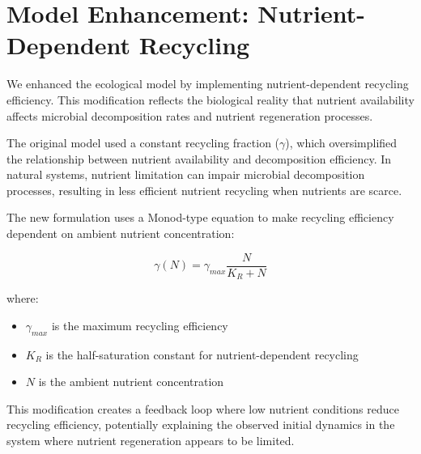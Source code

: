 \section{Model Enhancement: Nutrient-Dependent Recycling}

We enhanced the ecological model by implementing nutrient-dependent recycling efficiency. This modification reflects the biological reality that nutrient availability affects microbial decomposition rates and nutrient regeneration processes.

The original model used a constant recycling fraction ($\gamma$), which oversimplified the relationship between nutrient availability and decomposition efficiency. In natural systems, nutrient limitation can impair microbial decomposition processes, resulting in less efficient nutrient recycling when nutrients are scarce.

The new formulation uses a Monod-type equation to make recycling efficiency dependent on ambient nutrient concentration:

\[ \gamma(N) = \gamma_{max} \frac{N}{K_R + N} \]

where:
\begin{itemize}
    \item $\gamma_{max}$ is the maximum recycling efficiency
    \item $K_R$ is the half-saturation constant for nutrient-dependent recycling
    \item $N$ is the ambient nutrient concentration
\end{itemize}

This modification creates a feedback loop where low nutrient conditions reduce recycling efficiency, potentially explaining the observed initial dynamics in the system where nutrient regeneration appears to be limited.

